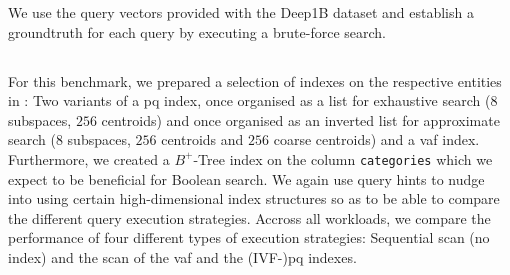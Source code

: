 We use the query vectors provided with the Deep1B dataset and establish a groundtruth for each query by executing a brute-force search.

\subsection{\cottontail}
\label{section:evaluation_bignns_cottontail}
For this benchmark, we prepared a selection of indexes on the respective entities in \cottontail{}: Two variants of a \acrshort{pq} index, once organised as a list for exhaustive search ($8$ subspaces, $256$ centroids) and once organised as an inverted list for approximate search ($8$ subspaces, $256$ centroids and $256$ coarse centroids) and a \acrshort{vaf} index. Furthermore, we created a $B^{+}$-Tree index on the column \texttt{categories} which we expect to be beneficial for Boolean search. We again use query hints to nudge \cottontail{} into using certain high-dimensional index structures so as to be able to compare the different query execution strategies. Accross all workloads, we compare the performance of four different types of execution strategies: Sequential scan (no index) and the scan of the \acrshort{vaf} and the (IVF-)\acrshort{pq} indexes.

